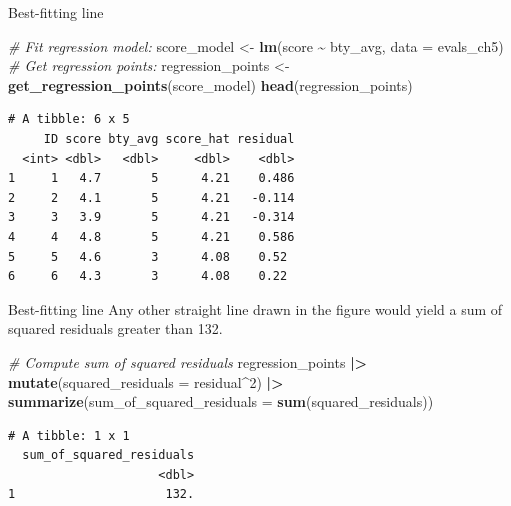 \documentclass[
  ignorenonframetext,
]{beamer}
\newenvironment{Shaded}{\begin{snugshade}}{\end{snugshade}}
\newcommand{\AttributeTok}[1]{\textcolor[rgb]{0.13,0.29,0.53}{#1}}
\newcommand{\CommentTok}[1]{\textcolor[rgb]{0.56,0.35,0.01}{\textit{#1}}}
\newcommand{\DecValTok}[1]{\textcolor[rgb]{0.00,0.00,0.81}{#1}}
\newcommand{\FunctionTok}[1]{\textcolor[rgb]{0.13,0.29,0.53}{\textbf{#1}}}
\newcommand{\NormalTok}[1]{#1}
\newcommand{\OtherTok}[1]{\textcolor[rgb]{0.56,0.35,0.01}{#1}}
\newcommand{\SpecialCharTok}[1]{\textcolor[rgb]{0.81,0.36,0.00}{\textbf{#1}}}
\begin{document}
\begin{frame}[fragile]{Best-fitting line}
\protect{}\label{best-fitting-line-2}
\normalsize

\begin{Shaded}
\begin{Highlighting}[]
\CommentTok{\# Fit regression model:}
\NormalTok{score\_model }\OtherTok{\textless{}{-}} \FunctionTok{lm}\NormalTok{(score }\SpecialCharTok{\textasciitilde{}}\NormalTok{ bty\_avg, }\AttributeTok{data =}\NormalTok{ evals\_ch5)}
\CommentTok{\# Get regression points:}
\NormalTok{regression\_points }\OtherTok{\textless{}{-}} \FunctionTok{get\_regression\_points}\NormalTok{(score\_model)}
\FunctionTok{head}\NormalTok{(regression\_points)}
\end{Highlighting}
\end{Shaded}

\begin{verbatim}
# A tibble: 6 x 5
     ID score bty_avg score_hat residual
  <int> <dbl>   <dbl>     <dbl>    <dbl>
1     1   4.7       5      4.21    0.486
2     2   4.1       5      4.21   -0.114
3     3   3.9       5      4.21   -0.314
4     4   4.8       5      4.21    0.586
5     5   4.6       3      4.08    0.52 
6     6   4.3       3      4.08    0.22 
\end{verbatim}

\normalsize
\end{frame}

\begin{frame}[fragile]{Best-fitting line}
\protect{}\label{best-fitting-line-3}
Any other straight line drawn in the figure would yield a sum of squared
residuals greater than 132.

\normalsize

\begin{Shaded}
\begin{Highlighting}[]
\CommentTok{\# Compute sum of squared residuals}
\NormalTok{regression\_points }\SpecialCharTok{|\textgreater{}}
  \FunctionTok{mutate}\NormalTok{(}\AttributeTok{squared\_residuals =}\NormalTok{ residual}\SpecialCharTok{\^{}}\DecValTok{2}\NormalTok{) }\SpecialCharTok{|\textgreater{}}
  \FunctionTok{summarize}\NormalTok{(}\AttributeTok{sum\_of\_squared\_residuals =} \FunctionTok{sum}\NormalTok{(squared\_residuals))}
\end{Highlighting}
\end{Shaded}

\begin{verbatim}
# A tibble: 1 x 1
  sum_of_squared_residuals
                     <dbl>
1                     132.
\end{verbatim}

\normalsize
\end{frame}
\end{document}
